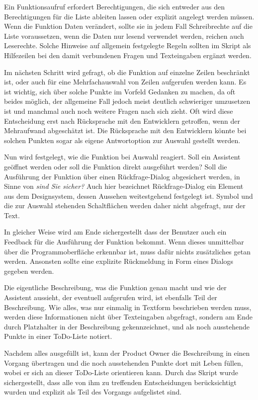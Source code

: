 Ein Funktionsaufruf erfordert Berechtigungen, die sich entweder aus den Berechtigungen für die Liste ableiten lassen oder explizit angelegt werden müssen. Wenn die Funktion Daten verändert, sollte sie in jedem Fall Schreibrechte auf die Liste voraussetzen, wenn die Daten nur lesend verwendet werden, reichen auch Leserechte. Solche Hinweise auf allgemein festgelegte Regeln sollten im Skript als Hilfezeilen bei den damit verbundenen Fragen und Texteingaben ergänzt werden.

Im nächsten Schritt wird gefragt, ob die Funktion auf einzelne Zeilen beschränkt ist, oder auch für eine Mehrfachauswahl von Zeilen aufgerufen werden kann. Es ist wichtig, sich über solche Punkte im Vorfeld Gedanken zu machen, da oft beides möglich, der allgemeine Fall jedoch meist deutlich schwieriger umzusetzen ist und manchmal auch noch weitere Fragen nach sich zieht. Oft wird diese Entscheidung erst nach Rücksprache mit den Entwicklern getroffen, wenn der Mehraufwand abgeschätzt ist. Die Rücksprache mit den Entwicklern könnte bei solchen Punkten sogar als eigene Antwortoption zur Auswahl gestellt werden.

Nun wird festgelegt, wie die Funktion bei Auswahl reagiert. Soll ein Assistent geöffnet werden oder soll die Funktion direkt ausgeführt werden? Soll die Ausführung der Funktion über einen Rückfrage-Dialog abgesichert werden, in Sinne von \emph{sind Sie sicher?} Auch hier bezeichnet Rückfrage-Dialog ein Element aus dem Designsystem, dessen Aussehen weitestgehend festgelegt ist. Symbol und die zur Auswahl stehenden Schaltflächen werden daher nicht abgefragt, nur der Text.

In gleicher Weise wird am Ende sichergestellt dass der Benutzer auch ein Feedback für die Ausführung der Funktion bekommt. Wenn dieses unmittelbar über die Programmoberfläche erkennbar ist, muss dafür nichts zusätzliches getan werden. Ansonsten sollte eine explizite Rückmeldung in Form eines Dialogs gegeben werden.

Die eigentliche Beschreibung, was die Funktion genau macht und wie der Assistent aussieht, der eventuell aufgerufen wird, ist ebenfalls Teil der Beschreibung. Wie alles, was nur einmalig in Textform beschrieben werden muss, werden diese Informationen nicht über Texteingaben abgefragt, sondern am Ende durch Platzhalter in der Beschreibung gekennzeichnet, und als noch ausstehende Punkte in einer ToDo-Liste notiert.

Nachdem alles ausgefüllt ist, kann der Product Owner die Beschreibung in einen Vorgang übertragen und die noch ausstehenden Punkte dort mit Leben füllen, wobei er sich an dieser ToDo-Liste orientieren kann. Durch das Skript wurde sichergestellt, dass alle von ihm zu treffenden Entscheidungen berücksichtigt wurden und explizit als Teil des Vorgangs aufgelistet sind. 

